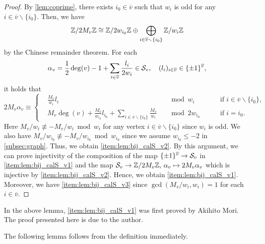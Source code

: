 \documentclass[11pt,a4paper,lualatex]{amsart}
\numberwithin{equation}{section} %
\begin{document}
\begin{proof}
	By \cref{lem:coprime}, there exists $ i_0 \in \overline{v} $ such that $ w_i $ is odd for any $ i \in \overline{v} \smallsetminus \{ i_0 \} $.
	Then, we have
	\begin{equation} %
		\Z/2M_v \Z 
		\cong 
		\Z/ 2w_{i_0} \Z \oplus \bigoplus_{i \in \overline{v} \smallsetminus \{ i_0 \}} \Z/w_i \Z
	\end{equation}
	by the Chinese remainder theorem.
	For each
	\[
	\alpha_v =
	\frac{1}{2}\deg(v) - 1 + \sum_{i \in \overline{v}} \frac{l_i}{2w_i}
	\in \mathcal{S}_v, \quad
	(l_i)_{i \in \overline{v}} \in \{ \pm 1 \}^{\overline{v}},
	\]
	it holds that
	\[
	2 M_v \alpha_v
	\equiv
	\left\{
	\begin{alignedat}{3}
		&\frac{M_v}{w_i} l_i &
		&\bmod w_i &
		&\quad
		\text{ if }
		i \in \overline{v} \smallsetminus \{ i_0 \}, \\
		&M_v \deg(v) + \frac{M_v}{w_{i_0}} l_{i_0} 
		+ \sum_{i \in \overline{v} \smallsetminus \{ i_0 \} } \frac{M_v}{w_i} &
		&\bmod 2w_{i_0} &
		&\quad
		\text{ if }
		i = i_0.
	\end{alignedat}
	\right.
	\]
	Here $ M_v / w_i \not\equiv - M_v / w_i \bmod w_i $ for any vertex $ i \in \overline{v} \smallsetminus \{ i_0 \} $ since $ w_i $ is odd.
	We also have $ M_v / w_{i_0} \not\equiv - M_v / w_{i_0} \bmod w_{i_0} $ since we assume $ w_{i_0} \le -2 $ in \cref{subsec:graph}.
	Thus, we obtain \cref{item:lem:bij_calS_v2}. 
	By this argument, we can prove injectivity of the composition of the map $ \{ \pm 1 \}^{\overline{v}} \to \mathcal{S}_v $ in \cref{item:lem:bij_calS_v1}
	and the map $ \mathcal{S}_v \to \mathbb{Z}/2M_{v}\mathbb{Z}, \, \alpha_v \mapsto 2M_v \alpha_v $ which is injective by \cref{item:lem:bij_calS_v2}.
	Hence, we obtain \cref{item:lem:bij_calS_v1}.
	Moreover, we have \cref{item:lem:bij_calS_v3} since $ \gcd(M_v / w_i, w_i) = 1 $ for each $ i \in \overline{v} $. 
\end{proof}

In the above lemma, \cref{item:lem:bij_calS_v1} was first proved by Akihito Mori.
The proof presented here is due to the author.

The following lemma follows from the definition immediately.
\end{document}

